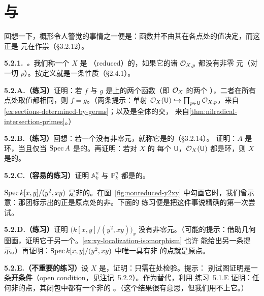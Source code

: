
\section{\trReducedness{}与\trIntegrality{}}

回想一下，概形令人警觉的事情之一便是：函数并不由其在各点处的值决定，而这正是%
\trNilpotent{}元在作祟（\S3.2.12）。

\textbf{5.2.1.}\ \emph{\trhDefinition{}。}\quad 我们称一个\trScheme{} $X$ 是%
\textbf{\trReduced}（reduced）的，如果它的诸\trStalk{} $\mathcal{O}_{X,p}$ 都没有非零%
\trNilpotent{}元（对一切 $p$）。\trReducedness{}按定义就是一条\trStalkLocal{}性质（\S2.4.1）。

\textbf{5.2.A.（练习）}\quad 证明：若 $f$ 与 $g$ 是\trReduced{}\trScheme{}上的两个函数（即 $\mathcal{O}_X$ 的两个%
\trGlobalSections），二者在所有点处取值都相同，则 $f=g$。（两条提示：单射%
$\mathcal{O}_X(\mathsf{U})\hookrightarrow\prod_{p\in\mathsf{U}}\mathcal{O}_{X,p}$，来自%
\cref{ex:sections-determined-by-germs}；以及\trNilradical{}是全体\trPrimeIdeal{}的交，
来自\cref{thm:nilradical-intersection-primes}。）

\textbf{5.2.B.（练习）}\quad 回想：若一个\trRing{}没有非零\trNilpotent{}元，就称它是\emph{\trReduced}的（\S3.2.14）。
证明：$A$ 是\trReduced{}环，当且仅当 $\operatorname{Spec} A$ 是\trReduced{}的。再证明：若对 $X$ 的
每个\trOpenSet{} $\mathsf{U}$，$\mathcal{O}_X(\mathsf{U})$ 都是\trReduced{}环，则\trScheme{}
$X$ 是\trReduced{}的。

\textbf{5.2.C.（容易的练习）}\quad 证明 $\mathbb{A}^n_k$ 与 $\mathbb{P}^n_k$ 都是\trReduced{}的。

\trScheme{} $\operatorname{Spec} k[x,y]/(y^2,xy)$ 是非\trReduced{}的。在图~\ref{fig:nonreduced-y2xy}
中勾画它时，我们曾示意：那团\trFuzz{}标示出的正是原点处的非\trReducedness{}。下面的
练习便是把这件事说精确的第一次尝试。

\textbf{5.2.D.（练习）}\quad 证明 $\bigl(k[x,y]/(y^2,xy)\bigr)_x$ 没有非零\trNilpotent{}元。（可能的提示：借助几何
图画，证明它\trIsomorphic{}于另一个\trRing。\cref{ex:xy-localization-isomorphism} 也许
能给出另一条提示。）再证明：$\operatorname{Spec} k[x,y]/(y^2,xy)$ 中唯一具有非\trReduced{}\trStalk{}
的点就是原点。

\textbf{5.2.E.（不重要的练习）}\quad 设 $X$ 是\trQuasicompact{}\trScheme，证明：只需在\trClosedPoint{}处检验\trReducedness{}。提示：
别试图证明\trReducedness{}是一条\textbf{开条件}（open condition，见注记~5.2.2）。作为替代，利用
练习~5.1.E 证明：任何非\trReduced{}的点，其闭包中都有一个非\trReduced{}的%
\trClosedPoint。（这个结果很有意思，但我们用不上它。）

